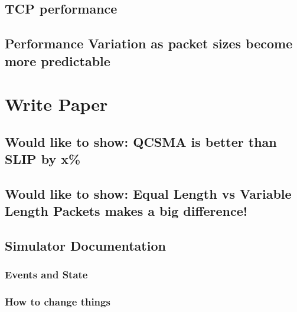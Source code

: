 \documentclass{IEEEtran}%
\begin{document}
\subsection{TCP performance}
\subsection{Performance Variation as packet sizes become more predictable}

\section{Write Paper}
\subsection{Would like to show: QCSMA is better than SLIP by x\%}
\subsection{Would like to show: Equal Length vs Variable Length Packets makes a big difference!}
\subsection{Simulator Documentation}
\subsubsection{Events and State}
\subsubsection{How to change things}

 
\end{document}
